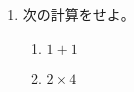 \documentclass{jlreq}
\newif\if main
\newif\if question-only
\newif\if question-only-nospace
\newif\if answer-only
\begin{document}
\begin{enumerate}
    \item 次の計算をせよ。
    \begin{enumerate}
        \item $1+1$
        \item $2\times 4$
    \end{enumerate}
\end{enumerate}
\end{document}

